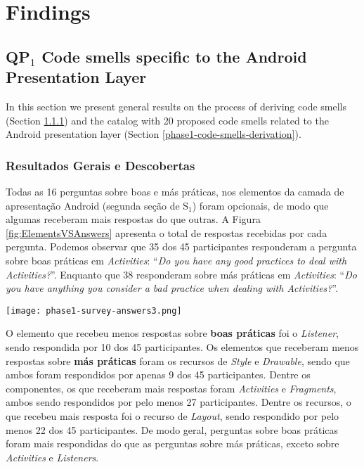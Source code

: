 \section{Findings}

\subsection{QP$_1$ Code smells specific to the Android Presentation Layer}
\label{phase1-results}

In this section we present general results on the process of deriving code smells (Section \ref{phase1-general-results}) and the catalog with 20 proposed code smells related to the Android presentation layer (Section \ref{phase1-code-smells-derivation}).

\subsubsection{Resultados Gerais e Descobertas}
\label{phase1-general-results}

Todas as 16 perguntas sobre boas e más práticas, nos elementos da camada de apresentação Android (segunda seção de S$_1$) foram opcionais, de modo que algumas receberam mais respostas do que outras. A Figura \ref{fig:ElementsVSAnswers} apresenta o total de respostas recebidas por cada pergunta. Podemos observar que 35 dos 45 participantes responderam a pergunta sobre boas práticas em \textit{Activities}: ``\textit{Do you have any good practices to deal with Activities?}''. Enquanto que 38 responderam sobre más práticas em \textit{Activities}: ``\textit{Do you have anything you consider a bad practice when dealing with Activities?}''.

\begin{figure*}[!htb]
\centering
\texttt{[image: phase1-survey-answers3.png]}
\caption{Total de respostas para cada pergunta sobre boas e más práticas nos oito elementos da camada de apresentação Android.}
\label{fig:ElementsVSAnswers}
\end{figure*}

O elemento que recebeu menos respostas sobre \textbf{\small boas práticas} foi o \textit{Listener}, sendo respondida por 10 dos 45 participantes. Os elementos que receberam menos respostas sobre \textbf{\small más práticas} foram os recursos de \textit{Style} e \textit{Drawable}, sendo que ambos foram respondidos por apenas 9 dos 45 participantes. Dentre os componentes, os que receberam mais respostas foram \textit{Activities} e \textit{Fragments}, ambos sendo respondidos por pelo menos 27 participantes. Dentre os recursos, o que recebeu mais resposta foi o recurso de \textit{Layout}, sendo respondido por pelo menos 22 dos 45 participantes. De modo geral, perguntas sobre boas práticas foram mais respondidas do que as perguntas sobre más práticas, exceto sobre \textit{Activities} e \textit{Listeners}.

